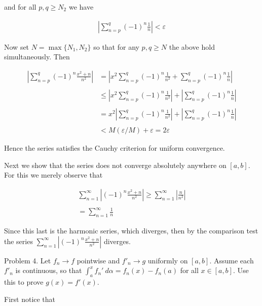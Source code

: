 \documentclass{article}
\begin{document}
  and for all $p,q\geq N_2$ we have 

  \begin{align*}
    \left|\sum_{n=p}^q (-1)^n \frac{1}{n} \right| < \varepsilon 
  \end{align*}

  Now set $N=\max\{N_1,N_2\}$ so that for any $p,q\geq N$ the above hold simultaneously.  Then 

  \begin{align*}
    \left|\sum_{n=p}^q (-1)^n \frac{x^2+n}{n^2} \right| &= \left| x^2\sum_{n=p}^q (-1)^n \frac{1}{n^2} +
    \sum_{n=p}^q (-1)^n \frac{1}{n}\right| \\\\
    &\leq \left| x^2\sum_{n=p}^q (-1)^n \frac{1}{n^2}\right| +
    \left| \sum_{n=p}^q (-1)^n \frac{1}{n}\right| \\\\
    & = x^2 \left| \sum_{n=p}^q (-1)^n \frac{1}{n^2}\right| +
    \left| \sum_{n=p}^q (-1)^n \frac{1}{n}\right| \\\\
    & < M (\varepsilon/M)+\varepsilon = 2\varepsilon
  \end{align*}

  Hence the series satisfies the Cauchy criterion for uniform convergence.

  Next we show that the series does not converge absolutely anywhere on $[a,b]$.  For this we merely observe that 

  \begin{align*}
    \sum_{n=1}^\infty \left|(-1)^n\frac{x^2+n}{n^2}\right| \geq \sum_{n=1}^\infty \left|\frac{n}{n^2}\right| \\\\
     = \sum_{n=1}^\infty \frac{1}{n}
  \end{align*}

  Since this last is the harmonic series, which diverges, then by the comparison test the series $\sum_{n=1}^\infty \left|(-1)^n\frac{x^2+n}{n^2}\right|$ diverges.

  \pagebreak

  {\Large \color{Sepia} Problem 4. Let $f_n\to f$ pointwise and $f'_n\to g$ uniformly on $[a,b]$.  Assume each $f'_n$ is continuous, so that $\int_a^x f_n'\ d\alpha=f_n(x)-f_n(a)$ for all $x\in[a,b]$.  Use this to prove $g(x)=f'(x)$.}

  \vspace{1cm}

  First notice that  
\end{document}
